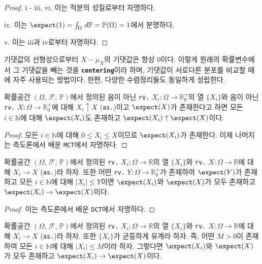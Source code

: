 \begin{proof}
    i - iii, vi. 이는 적분의 성질로부터 자명하다.

    iv. 이는 $\expect(1)=\int_\Omega\,d\mathbb{P}=\mathbb{P}(\Omega)=1$에서 분명하다.

    v. 이는 iii과 iv로부터 자명하다.
\end{proof}

기댓값의 선형성으로부터 $X-\mu_X$의 기댓값은 항상 $0$이다. 이렇게 원래의 확률변수에서 그 기댓값을 빼는 것을 \textbf{\texttt{centering}}이라 하며, 기댓값이 서로다른 분포를 비교할 때에 자주 사용되는 방법이다. 한편, 다양한 수렴정리들도 동일하게 성립한다.

\begin{theorem}
    확률공간 $(\Omega,\,\mathcal{F},\,\mathbb{P})$에서 정의된 음이 아닌 \texttt{rv.} $X_i:\Omega\to\mathbb{R}^+_0$의 열 $\{X_i\}$와 음이 아닌 \texttt{rv.} $X:\Omega\to\mathbb{R}^+_0$에 대해 $X_i\uparrow X$ (\texttt{as.})이고 $\expect(X)$가 존재한다고 하면 모든 $i\in\mathbb{N}$에 대해 $\expect(X_i)$도 존재하고 $\expect(X_i)\uparrow\expect(X)$이다.
\end{theorem}

\begin{proof}
    모든 $i\in\mathbb{N}$에 대해 $0\leq X_i\leq X$이므로 $\expect(X_i)$가 존재한다. 이제 나머지는 측도론에서 배운 \texttt{MCT}에서 자명하다.
\end{proof}

\begin{theorem}
    확률공간 $(\Omega,\,\mathcal{F},\,\mathbb{P})$에서 정의된 \texttt{rv.} $X_i:\Omega\to\mathbb{R}$의 열 $\{X_i\}$와 \texttt{rv.} $X:\Omega\to\mathbb{R}$에 대해 $X_i\to X$ (\texttt{as.})라 하자. 또한 어떤 \texttt{rv.} $Y:\Omega\to\mathbb{R}^+_0$가 존재하여 $\expect(Y)$가 존재하고 모든 $i\in\mathbb{N}$에 대해 $|X_i|\leq Y$이면 $\expect(X_i)$와 $\expect(X)$가 모두 존재하고 $\expect(X_i)\to\expect(X)$이다.
\end{theorem}

\begin{proof}
    이는 측도론에서 배운 \texttt{DCT}에서 자명하다.
\end{proof}

\begin{corollary}
    확률공간 $(\Omega,\,\mathcal{F},\,\mathbb{P})$에서 정의된 \texttt{rv.} $X_i:\Omega\to\mathbb{R}$의 열 $\{X_i\}$와 \texttt{rv.} $X:\Omega\to\mathbb{R}$에 대해 $X_i\to X$ (\texttt{as.})라 하자. 또한 $\{X_i\}$가 균등하게 유계라 하자. 즉, 어떤 $M>0$이 존재하여 모든 $i\in\mathbb{N}$에 대해 $|X_i|\leq M$이라 하자. 그렇다면 $\expect(X_i)$와 $\expect(X)$가 모두 존재하고 $\expect(X_i)\to\expect(X)$이다.
\end{corollary}

